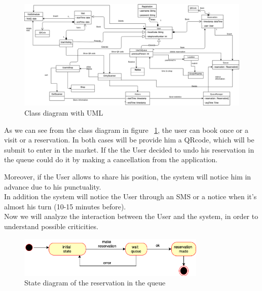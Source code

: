 \begin{figure}[h]
  \caption{Class diagram with UML}
  \label{fig:UML}
  \centering
  \includegraphics[width=1.2\textwidth, height=0.7\textwidth]{diagrams/UML_simple.png}

\end{figure}
\par 
\medskip
As we can see from the class diagram in figure ~\ref{fig:UML}, the user can book once or a visit or a reservation.
In both cases will be provide him a QRcode, which will be submit to enter in the market. 
If the the User decided to undo his reservation in the queue could do it by making a cancellation from the application. 
\par
\medskip
Moreover, if the User allows to share his position, the system will notice him in advance due to his punctuality.
\\
In addition the system will notice the User through an SMS or a notice when it's almost his turn (10-15 minutes before).
\\
Now we will analyze the interaction between the User and the system, in order to understand possible criticities.
\par 
\bigskip

\begin{figure}[h]
  \caption{State diagram of the reservation in the queue}
  \label{fig:Reservation}
  \centering
  \includegraphics[width=0.8\textwidth, height=0.2\textwidth]{diagrams/2-reservation.png}

\end{figure}
\par 
\medskip


